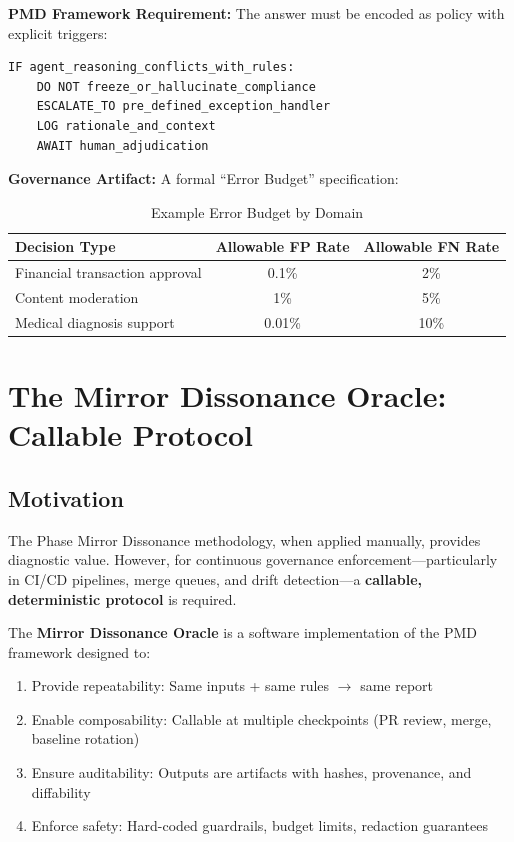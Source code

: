 \documentclass[11pt,a4paper]{article}
\begin{document}
\textbf{PMD Framework Requirement:} The answer must be encoded as policy with explicit triggers:

\begin{verbatim}
IF agent_reasoning_conflicts_with_rules:
    DO NOT freeze_or_hallucinate_compliance
    ESCALATE_TO pre_defined_exception_handler
    LOG rationale_and_context
    AWAIT human_adjudication
\end{verbatim}

\textbf{Governance Artifact:} A formal ``Error Budget'' specification:

\begin{table}[h]
\centering
\begin{tabular}{|l|c|c|}
\hline
\textbf{Decision Type} & \textbf{Allowable FP Rate} & \textbf{Allowable FN Rate} \\ \hline
Financial transaction approval & 0.1\% & 2\% \\ \hline
Content moderation & 1\% & 5\% \\ \hline
Medical diagnosis support & 0.01\% & 10\% \\ \hline
\end{tabular}
\caption{Example Error Budget by Domain}
\end{table}

\section{The Mirror Dissonance Oracle: Callable Protocol}

\subsection{Motivation}

The Phase Mirror Dissonance methodology, when applied manually, provides diagnostic value. However, for continuous governance enforcement—particularly in CI/CD pipelines, merge queues, and drift detection—a \textbf{callable, deterministic protocol} is required.

The \textbf{Mirror Dissonance Oracle} is a software implementation of the PMD framework designed to:

\begin{enumerate}
\item Provide repeatability: Same inputs + same rules $\rightarrow$ same report
\item Enable composability: Callable at multiple checkpoints (PR review, merge, baseline rotation)
\item Ensure auditability: Outputs are artifacts with hashes, provenance, and diffability
\item Enforce safety: Hard-coded guardrails, budget limits, redaction guarantees
\end{enumerate}
\end{document}
